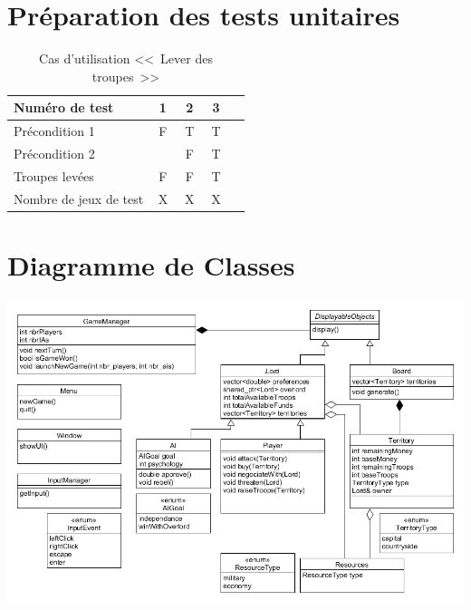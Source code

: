 \documentclass[12pt,a4paper]{article}
\begin{document}
\newpage

\section{Préparation des tests unitaires}

\begin{table}[htbp!]
\begin{tabular}{|p{0.6\linewidth}|c|c|c|c|}
\hline 
Numéro de test
&1&2&3\\ 
\hline 
\hline
Précondition 1
&F&T&T\\ 
\hline
Précondition 2
& &F&T\\
\hline
\hline
Troupes levées
&F&F&T\\
\hline
\hline
Nombre de jeux de test
&X&X&X\\
\hline 
\end{tabular} 
\caption{Cas d'utilisation <<~Lever des troupes~>>}
\end{table}

\newpage

\section{Diagramme de Classes}

\includegraphics[scale=0.5]{Diagramme_Classes/diagramme_classes.png} 
\end{document}
